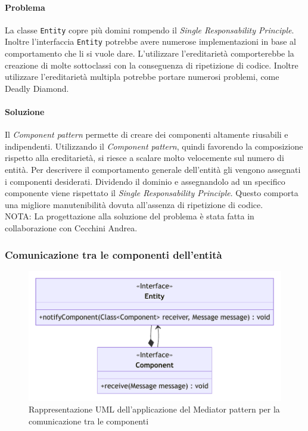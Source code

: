 \documentclass[a4paper,12pt]{report}
\begin{document}
\paragraph{Problema} La classe \texttt{Entity} copre più domini rompendo il \textit{Single Responsability Principle}.
Inoltre l'interfaccia \texttt{Entity} potrebbe avere numerose implementazioni in base al comportamento che li si vuole dare.
L'utilizzare l'ereditarietà comporterebbe la creazione di molte sottoclassi con la conseguenza di ripetizione di codice.
Inoltre utilizzare l'ereditarietà multipla potrebbe portare numerosi problemi, come Deadly Diamond.

\paragraph{Soluzione} Il \textit{Component pattern} permette di creare dei componenti altamente riusabili e indipendenti.
Utilizzando il \textit{Component pattern}, quindi favorendo la composizione rispetto alla ereditarietà, si riesce a scalare
molto velocemente sul numero di entità.
Per descrivere il comportamento generale dell'entità gli vengono assegnati i componenti desiderati.
Dividendo il dominio e assegnandolo ad un specifico componente viene rispettato il \textit{Single Responsability Principle}.
Questo comporta una migliore manutenibilità dovuta all'assenza di ripetizione di codice.\\
NOTA: La progettazione alla soluzione del problema è stata fatta in collaborazione con Cecchini Andrea.

\subsubsection{Comunicazione tra le componenti dell'entità}

\begin{figure}[H]
\centering{}
\includegraphics[width=\textwidth]{img/ComponentCommunicationUML}
\caption{Rappresentazione UML dell'applicazione del Mediator pattern per la comunicazione tra le componenti}
\end{figure}
\end{document}
